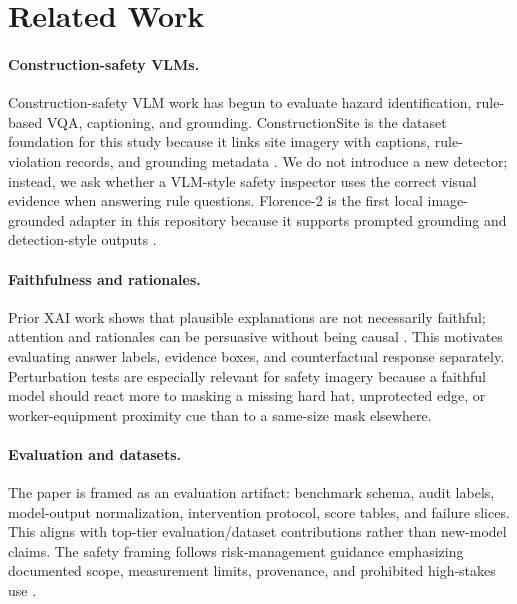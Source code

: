 \section{Related Work}

\paragraph{Construction-safety VLMs.}
Construction-safety VLM work has begun to evaluate hazard identification, rule-based VQA, captioning, and grounding. ConstructionSite is the dataset foundation for this study because it links site imagery with captions, rule-violation records, and grounding metadata \citep{chen2025constructionsite}. We do not introduce a new detector; instead, we ask whether a VLM-style safety inspector uses the correct visual evidence when answering rule questions. Florence-2 is the first local image-grounded adapter in this repository because it supports prompted grounding and detection-style outputs \citep{xiao2024florence}.

\paragraph{Faithfulness and rationales.}
Prior XAI work shows that plausible explanations are not necessarily faithful; attention and rationales can be persuasive without being causal \citep{jain2019attention}. This motivates evaluating answer labels, evidence boxes, and counterfactual response separately. Perturbation tests are especially relevant for safety imagery because a faithful model should react more to masking a missing hard hat, unprotected edge, or worker-equipment proximity cue than to a same-size mask elsewhere.

\paragraph{Evaluation and datasets.}
The paper is framed as an evaluation artifact: benchmark schema, audit labels, model-output normalization, intervention protocol, score tables, and failure slices. This aligns with top-tier evaluation/dataset contributions rather than new-model claims. The safety framing follows risk-management guidance emphasizing documented scope, measurement limits, provenance, and prohibited high-stakes use \citep{nist2023airmf}.
